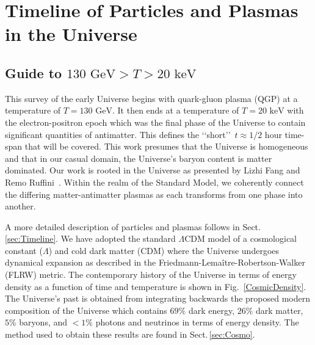 \documentclass[universe,article,submit,moreauthors,pdftex,a4paper]{Definitions/mdpi}
\newcommand{\GeV}{\text{ GeV}}
\newcommand{\keV}{\text{ keV}}
\newcommand*{\rf}[1]{Fig.~{\ref{#1}}}
\newcommand*{\rsec}[1]{Sect.\,{\ref{#1}}}
\begin{document}

\tableofcontents

\section{Timeline of Particles and Plasmas in the Universe}\label{sec:Intro}
\subsection{Guide to \texorpdfstring{$130\GeV>T>20\keV$}{130\GeV>T>20\keV}}\label{sec:Guide}
\noindent This survey of the early Universe begins with quark-gluon plasma (QGP) at a temperature of $T=130\GeV$. It then ends at a temperature of $T=20\keV$ with the electron-positron epoch which was the final phase of the Universe to contain significant quantities of antimatter. This defines the \lq\lq short\rq\rq\ $t\approx1/2$ hour time-span that will be covered. This work presumes that the Universe is homogeneous and that in our casual domain, the Universe's baryon content is matter dominated. Our work is rooted in the Universe as presented by Lizhi Fang and Remo Ruffini~\cite{fang1984cosmology,fang1985galaxies,fang1987quantum}. Within the realm of the Standard Model, we coherently connect the differing matter-antimatter plasmas as each transforms from one phase into another.

A more detailed description of particles and plasmas follows in \rsec{sec:Timeline}. We have adopted the standard $\Lambda$CDM model of a cosmological constant ($\Lambda$) and cold dark matter (CDM) where the Universe undergoes dynamical expansion as described in the Friedmann-Lema\^itre-Robertson-Walker (FLRW) metric. The contemporary history of the Universe in terms of energy density as a function of time and temperature is shown in \rf{CosmicDensity}. The Universe's past is obtained from integrating backwards the proposed modern composition of the Universe which contains $69\%$ dark energy, $26\%$ dark matter, $5\%$ baryons, and $<1\%$ photons and neutrinos in terms of energy density. The method used to obtain these results are found in \rsec{sec:Cosmo}.
\end{document}
